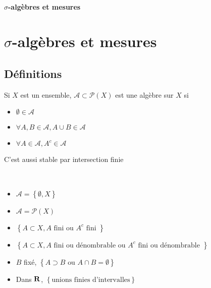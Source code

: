 \ifsolo
    ~

    \vspace{1cm}

    \begin{center}
        \textbf{\LARGE $\sigma$-algèbres et mesures} \\[1em]
    \end{center}
    \tableofcontents
\else
    \chapter{$\sigma$-algèbres et mesures}

    \minitoc
\fi
\thispagestyle{empty}

\section{Définitions}

\begin{dfn}
    Si $X$ est un ensemble,  $\mathcal  A \subset \mathcal  P(X)$ est une algèbre sur $X$ si  \begin{itemize}
        \item $\emptyset \in  \mathcal  A$
        \item $\forall  A, B \in  \mathcal  A, A \cup B \in  \mathcal  A$
        \item $\forall  A \in  \mathcal  A, A^c \in \mathcal  A$
    \end{itemize}
\end{dfn}

\begin{rem}
C'est aussi stable par intersection finie
\end{rem}

\begin{ex}~
\begin{itemize}
    \item $\mathcal  A= \left\{ \emptyset, X \right\} $
    \item $\mathcal  A = \mathcal  P(X)$
    \item $\left\{ A \subset X, A \text{ fini ou }A^c \text{ fini } \right\} $
    \item $\left\{ A \subset X, A \text{ fini ou dénombrable ou }A^c \text{ fini ou dénombrable } \right\} $ 
    \item $B$ fixé,  $\left\{ A \supset B \text{ ou } A\cap B=\emptyset\right\} $
    \item Dans $\mathbf R$, $\left\{ \text{unions finies d'intervalles} \right\} $
\end{itemize}
\end{ex}

